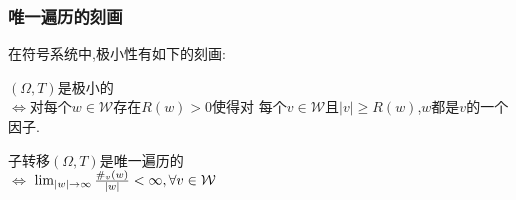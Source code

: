 \documentclass[compress,red]{beamer}
\begin{document}
\begin{frame}
\frametitle{唯一遍历的刻画}
在符号系统中,极小性有如下的刻画:
\begin{theorem}
$(\Omega,T)$是极小的\\$\Longleftrightarrow$对每个$w\in \mathcal{W}$存在$R(w)>0$使得对%
每个$v\in \mathcal{W}$且$|v|\geq R(w)$,$w$都是$v$的一个因子.
\end{theorem}
\pause
\begin{theorem}
子转移$(\Omega,T)$是唯一遍历的\\$\Longleftrightarrow$ $\lim_{|w| \to \infty}{\#_v(w)\over |w |}<\infty, \forall v\in \mathcal{W}$
\end{theorem}
\end{frame}

\begin{frame}
\frametitle{}
\end{frame}
\end{document}
